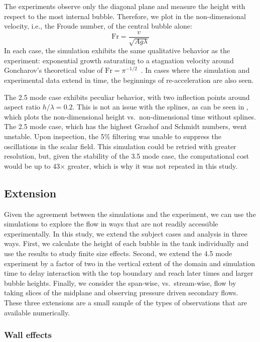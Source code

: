 The experiments observe only the diagonal plane and measure the height with respect to the most internal bubble.
Therefore, we plot in  the non-dimensional velocity, i.e., the Froude number, of the central bubble alone:
\begin{equation}
	\text{Fr} = \frac{v}{\sqrt{ A g \lambda}}
\end{equation}
In each case, the simulation exhibits the same qualitative behavior as the experiment:
exponential growth saturating to a stagnation velocity around Goncharov's theoretical value of $\text{Fr} = \pi^{-1/2}$~\cite{Goncharov2002}.
In cases where the simulation and experimental data extend in time, the beginnings of re-acceleration are also seen.

The 2.5 mode case exhibits peculiar behavior, with two inflection points around aspect ratio $h / \lambda = 0.2$.
This is not an issue with the splines, as can be seen in , which plots the non-dimensional height vs.\ non-dimensional time without splines.
The 2.5 mode case, which has the highest Grashof and Schmidt numbers, went unstable.
Upon inspection, the 5\% filtering was unable to suppress the oscillations in the scalar field.
This simulation could be retried with greater resolution, but, given the stability of the 3.5 mode case, the computational cost would be up to 43$\times$ greater, which is why it was not repeated in this study.

\subsection{Extension}

Given the agreement between the simulations and the experiment, we can use the simulations to explore the flow in ways that are not readily accessible experimentally.
In this study, we extend the subject cases and analysis in three ways.
First, we calculate the height of each bubble in the tank individually and use the results to study finite size effects.
Second, we extend the 4.5 mode experiment by a factor of two in the vertical extent of the domain and simulation time to delay interaction with the top boundary and reach later times and larger bubble heights.
Finally, we consider the span-wise, vs.\ stream-wise, flow by taking slices of the midplane and observing pressure driven secondary flows.
These three extensions are a small sample of the types of observations that are available numerically.

\subsubsection{Wall effects}

